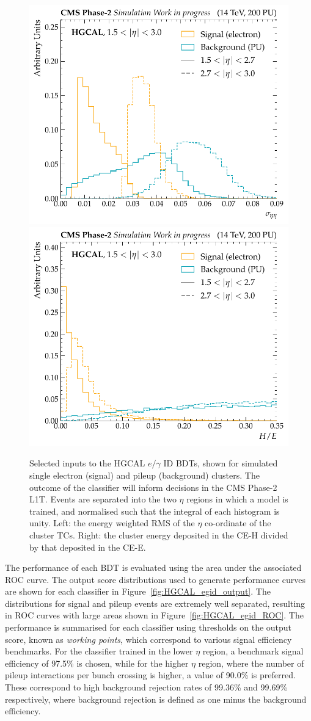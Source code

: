 \begin{figure}[htbp!]
\centering
\includegraphics[width=0.49\linewidth]{Figures/Detector/HGCAL/InputsOutputs/sig_vs_bkg_cl3d_seetot_both_eta.pdf}\hfill%
\includegraphics[width=0.49\linewidth]{Figures/Detector/HGCAL/InputsOutputs/sig_vs_bkg_cl3d_hoe_both_eta.pdf}
\caption[Selected inputs to the HGCAL L1T $e/\gamma$ identification BDTs.]{Selected inputs to the HGCAL $e/\gamma$ ID BDTs, shown for simulated single electron (signal) and pileup (background) clusters. The outcome of the classifier will inform decisions in the CMS Phase-2 L1T. Events are separated into the two $\eta$ regions in which a model is trained, and normalised such that the integral of each histogram is unity.  Left: the energy weighted RMS of the $\eta$ co-ordinate of the cluster TCs. Right: the cluster energy deposited in the CE-H divided by that deposited in the CE-E.}
\label{fig:HGCAL_egid_inputs}
\end{figure}

The performance of each BDT is evaluated using the area under the associated ROC curve. The output score distributions used to generate performance curves are shown for each classifier in Figure~\ref{fig:HGCAL_egid_output}. The distributions for signal and pileup events are extremely well separated, resulting in ROC curves with large areas shown in Figure~\ref{fig:HGCAL_egid_ROC}. The performance is summarised for each classifier using thresholds on the output score, known as \textit{working points}, which correspond to various signal efficiency benchmarks. For the classifier trained in the lower $\eta$ region, a benchmark signal efficiency of 97.5\% is chosen, while for the higher $\eta$ region, where the number of pileup interactions per bunch crossing is higher, a value of 90.0\% is preferred. These correspond to high background rejection rates of 99.36\% and 99.69\% respectively, where background rejection is defined as one minus the background efficiency.

